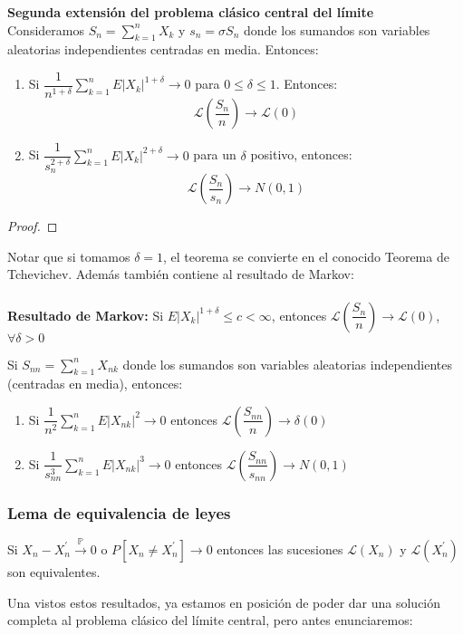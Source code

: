 \begin{theorem} \textbf{Segunda extensión del problema clásico central del límite}\\

Consideramos $S_n=\displaystyle\sum_{k=1}^n X_k$ y $s_n=\sigma S_n$ donde los sumandos son variables aleatorias independientes centradas en media. Entonces:
\begin{enumerate}
\item Si $\dfrac{1}{n^{1+\delta}}\displaystyle\sum_{k=1}^n E|X_k|^{1+\delta}\rightarrow 0$ para $0\leq\delta\leq 1$. Entonces:
$$\mathcal{L}\left( \frac{S_n}{n} \right)\rightarrow \mathcal{L}(0)$$
\item Si $\dfrac{1}{s_n^{2+\delta}}\displaystyle\sum_{k=1}^n E|X_k|^{2+\delta}\rightarrow 0$ para un $\delta$ positivo, entonces:
$$\mathcal{L}\left( \frac{S_n}{s_n} \right)\rightarrow N(0,1)$$
\end{enumerate}
\end{theorem}
\begin{proof}
\end{proof}
Notar que si tomamos $\delta=1$, el teorema se convierte en el conocido Teorema de Tchevichev. Además también contiene al resultado de Markov:
\\\\
\textbf{Resultado de Markov:} Si $E|X_k|^{1+\delta}\leq c < \infty$, entonces $\mathcal{L}\left( \dfrac{S_n}{n} \right)\rightarrow \mathcal{L}(0)$, $\forall \delta >0$
\begin{lemma}
Si $S_{nn}=\displaystyle\sum_{k=1}^n X_{nk}$ donde los sumandos son variables aleatorias independientes (centradas en media), entonces:
\begin{enumerate}
\item Si $\dfrac{1}{n^2}\displaystyle\sum_{k=1}^n E|X_{nk}|^2\rightarrow 0$ entonces $\mathcal{L} \left( \dfrac{S_{nn}}{n} \right)\rightarrow \delta(0)$
\item Si $\dfrac{1}{s_{nn}^3}\displaystyle\sum_{k=1}^n E|X_{nk}|^3\rightarrow 0$ entonces $\mathcal{L} \left( \dfrac{S_{nn}}{s_{nn}} \right)\rightarrow N(0,1)$
\end{enumerate}
\end{lemma}
\subsubsection{Lema de equivalencia de leyes}
\begin{lemma}
Si $X_n - X_n ^{\prime}  \stackrel{\mathbb{P}}{\longrightarrow} 0$ o $P[X_n \neq X_n^{\prime}]\longrightarrow 0$ entonces las sucesiones $\mathcal{L}(X_n)$ y $\mathcal{L}(X_n^{\prime})$ son equivalentes.
\end{lemma}
Una vistos estos resultados, ya estamos en posición de poder dar una solución completa al problema clásico del límite central, pero antes enunciaremos:
